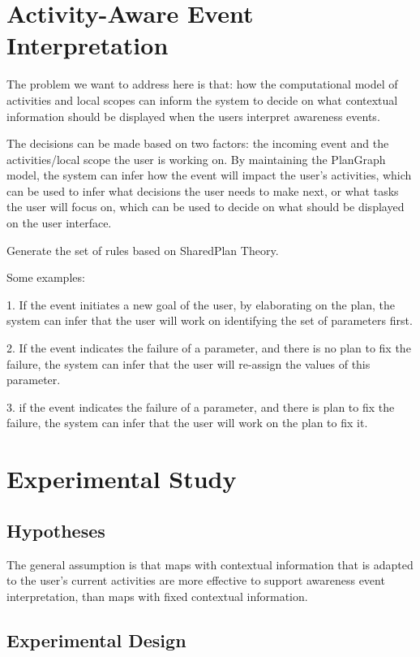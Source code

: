 \section{Activity-Aware Event Interpretation} %
\label{sec:activity_aware_event_interpretation}
The problem we want to address here is that: how the computational model of activities and local scopes can inform the system to decide on what contextual information should be displayed when the users interpret awareness events.

The decisions can be made based on two factors: the incoming event and the activities/local scope the user is working on. By maintaining the PlanGraph model, the system can infer how the event will impact the user's activities, which can be used to infer what decisions the user needs to make next, or what tasks the user will focus on, which can be used to decide on what should be displayed on the user interface.

Generate the set of rules based on SharedPlan Theory.

Some examples:

1. If the event initiates a new goal of the user, by elaborating on the plan, the system can infer that the user will work on identifying the set of parameters first.

2. If the event indicates the failure of a parameter, and there is no plan to fix the failure, the system can infer that the user will re-assign the values of this parameter.

3. if the event indicates the failure of a parameter, and there is plan to fix the failure, the system can infer that the user will work on the plan to fix it.


\section{Experimental Study}
\subsection{Hypotheses} %
\label{sec:hypotheses}
The general assumption is that maps with contextual information that is adapted to the user's current activities are more effective to support awareness event interpretation, than maps with fixed contextual information.

\subsection{Experimental Design} %
\label{sec:experimental_design}
